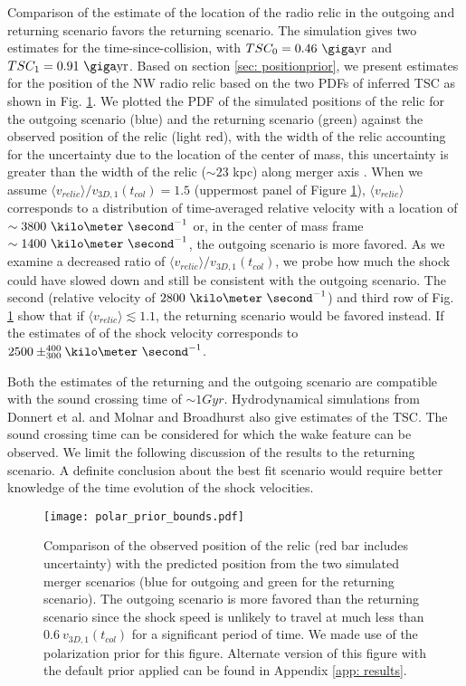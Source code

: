 Comparison of the estimate of the location of the radio relic in the
outgoing and returning scenario favors the returning scenario.
The simulation gives two estimates for
the time-since-collision, with $TSC_0 = 0.46~\giga \text{yr}$ and $TSC_1 =
0.91~\giga \text{yr}$. Based on section \ref{sec: positionprior}, we
present estimates for the position of the NW radio relic based on the two PDFs
of inferred TSC as shown in Fig. \ref{fig: positionprior}. We plotted
the PDF of the simulated positions of the relic for the outgoing scenario
(blue) and the returning scenario (green) against
the observed position of the relic (light red), with the width of the
relic accounting for the uncertainty due to the location of the center of
mass, this uncertainty is greater than the width of the relic ($\sim$$23$
kpc) along merger axis \citep{L13}. When we
assume $\langle v_{relic} \rangle / v_{3D,1}(t_{col}) = 1.5$ (uppermost
panel of Figure \ref{fig: positionprior}), $\langle v_{relic} \rangle$
corresponds to a distribution of time-averaged relative velocity with a
location of $\sim 3800~\kilo \meter~\second^{-1}$ or, in the center of
mass frame $\sim 1400~\kilo\meter~\second^{-1}$, the outgoing scenario is more favored. As we examine a decreased ratio of  $\langle v_{relic} \rangle /
v_{3D,1}(t_{col})$, we probe how much the shock could have slowed down
and still be consistent with the outgoing scenario. The second (relative
velocity of $2800~\kilo\meter~\second^{-1}$) and third row of
Fig. \ref{fig: positionprior} show that if $\langle v_{relic} \rangle
\lesssim 1.1 $, the returning scenario would be favored instead.
If the estimates of \citet{L13} of the shock velocity corresponds to $2500 \pm
^{400}_{300} \kilo \meter~\second^{-1}$. 

Both the estimates of the returning and the outgoing scenario are
compatible with the sound crossing time of $\sim 1 Gyr$.  
Hydrodynamical simulations from Donnert et al. and Molnar and Broadhurst
also give estimates of the TSC. The sound
crossing time can be considered for which the wake feature can be observed. 
We limit the following discussion of the results to the returning scenario.
A definite conclusion about the best fit scenario would require better
knowledge of the time evolution of the shock velocities. 

\begin{figure}
	\texttt{[image: polar\_prior\_bounds.pdf]}
	\caption{Comparison of the observed position of the relic (red bar
		includes uncertainty) with the
	predicted position from the two simulated merger scenarios (blue for
	outgoing and green for the returning scenario). The outgoing scenario
	is more favored than the returning scenario since the shock speed is
	unlikely to travel at much less than $0.6~v_{3D,1}(t_{col})$ for a
	significant period of time. We made use of the polarization prior 
	for this figure. Alternate version of this figure with the default prior applied can
	be found in Appendix \ref{app: results}. \label{fig: positionprior}}
\end{figure}

